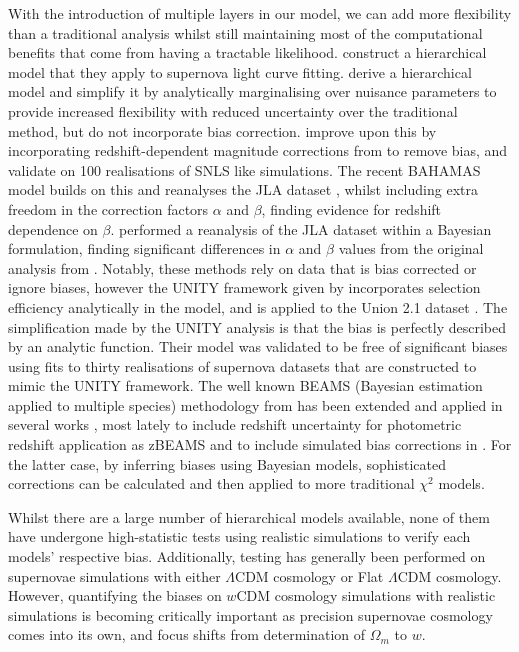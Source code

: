 \documentclass[a4paper,fleqn,usenatbib]{mnras}
\newcommand{\green}{\color{forestgreen}}
\begin{document}
With the introduction of multiple layers in our model, we can add more flexibility than a traditional analysis whilst still maintaining most of the computational benefits that come from having a tractable likelihood. \citet{Mandel2009, Mandel2011a, Mandel2017} construct a hierarchical model that they apply to supernova light curve fitting. \citet{March2011} derive a hierarchical model and simplify it by analytically marginalising over nuisance parameters to provide increased flexibility with reduced uncertainty over the traditional method, but do not incorporate bias correction. \citet{March2014, Karpenka2015} improve upon this by incorporating redshift-dependent magnitude corrections from \citet{Perrett2010} to remove bias, and validate on 100 realisations of SNLS like simulations. The recent BAHAMAS model \citep{Shariff2016} builds on this and reanalyses the JLA dataset \citep[using redshift dependent bias corrections from][]{Betoule2014}, whilst including extra freedom in the correction factors $\alpha$ and $\beta$, finding evidence for redshift dependence on $\beta$. \citet{Ma2016} performed a reanalysis of the JLA dataset within a Bayesian formulation, finding significant differences in $\alpha$ and $\beta$ values from the original analysis from \citet{Betoule2014}. Notably, these methods rely on data that is bias corrected or ignore biases, however the UNITY framework given by \citet{Rubin2015} incorporates selection efficiency analytically in the model, and is applied to the Union 2.1 dataset \citep{Suzuki2012}. The simplification made by the UNITY analysis is that the bias is {\green perfectly described} by an analytic function. Their model was validated to be free of significant biases using fits to {\green thirty realisations of supernova datasets that are constructed to mimic the UNITY framework}. The well known BEAMS (Bayesian estimation applied to multiple species) methodology from \citet{Kunz2007} has been extended and applied in several works \citep{Hlozek2012}, most lately to include redshift uncertainty for photometric redshift application as zBEAMS \citep{Roberts2017} and to include simulated bias corrections in \citet{Kessler2017}. For the latter case, by inferring biases using Bayesian models, sophisticated corrections can be calculated and then applied to more traditional $\chi^2$ models.


Whilst there are a large number of hierarchical models available, none of them have undergone high-statistic tests using realistic simulations to verify each models' respective bias. {\green Additionally, testing has generally been performed on supernovae simulations with either $\Lambda$CDM cosmology or Flat $\Lambda$CDM cosmology. However, quantifying the biases on $w$CDM cosmology simulations with realistic simulations is becoming critically important as precision supernovae cosmology comes into its own, and focus shifts from determination of $\Omega_m$ to $w$.}
\end{document}
